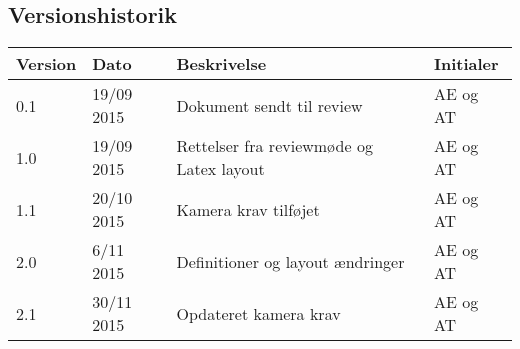 \subsection{Versionshistorik}
\begin{center}
		\begin{longtable}{ | m{1.5cm} | m{2cm}| m{7cm}| m{2cm}| } 
			\hline
			\textbf{Version}  & \textbf{Dato} & \textbf{Beskrivelse} & \textbf{Initialer}  \\ 
			\hline
			0.1  &  19/09 2015  & Dokument sendt til review & AE og AT \\
			\hline
		1.0  &  19/09 2015  & Rettelser fra reviewmøde og Latex layout & AE og AT \\
		\hline
		1.1  &  20/10 2015  & Kamera krav tilføjet & AE og AT \\
		\hline
		2.0  &  6/11 2015  & Definitioner og layout ændringer & AE og AT \\
		\hline
		2.1  &  30/11 2015  & Opdateret kamera krav & AE og AT \\
			\hline
		\end{longtable}
		
	\end{center}
